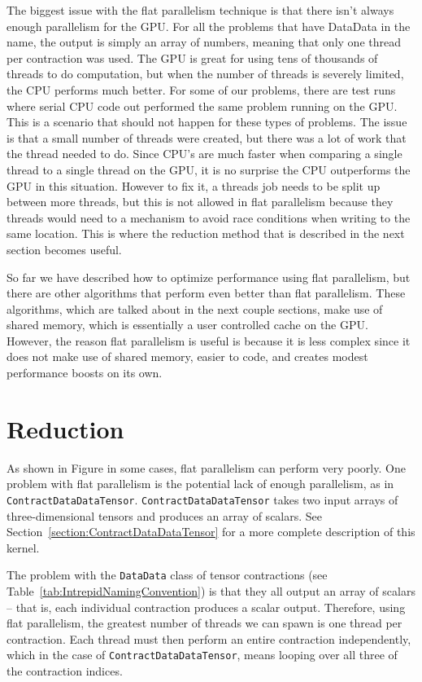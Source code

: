 The biggest issue with the flat parallelism technique is that there isn't always enough parallelism for the GPU. For all the problems that have DataData in the name, the output is simply an array of numbers, meaning that only one thread per contraction was used. The GPU is great for using tens of thousands of threads to do computation, but when the number of threads is severely limited, the CPU performs much better. For some of our problems, there are test runs where serial CPU code out performed the same problem running on the GPU. This is a scenario that should not happen for these types of problems. The issue is that a small number of threads were created, but there was a lot of work that the thread needed to do. Since CPU's are much faster when comparing a single thread to a single thread on the GPU, it is no surprise the CPU outperforms the GPU in this situation. However to fix it, a threads job needs to be split up between more threads, but this is not allowed in flat parallelism because they threads would need to a mechanism to avoid race conditions when writing to the same location. This is where the reduction method that is described in the next section becomes useful.

So far we have described how to optimize performance using flat parallelism, but there are other algorithms that perform even better than flat parallelism. These algorithms, which are talked about in the next couple sections, make use of shared memory, which is essentially a user controlled cache on the GPU. However, the reason flat parallelism is useful is because it is less complex since it does not make use of shared memory, easier to code, and creates modest performance boosts on its own. 

\section{Reduction}
As shown in Figure %
in some cases, flat parallelism can perform very poorly.  One problem with flat
parallelism is the potential lack of enough parallelism, as in
\texttt{ContractDataDataTensor}.  \texttt{ContractDataDataTensor} takes two
input arrays of three-dimensional tensors and produces an array of scalars.  See
Section~\ref{section:ContractDataDataTensor} for a more complete description of
this kernel.

The problem with the \texttt{DataData} class of tensor contractions (see
Table~\ref{tab:IntrepidNamingConvention}) is that they all output an array of
scalars -- that is, each individual contraction produces a scalar output.
Therefore, using flat parallelism, the greatest number of threads we can spawn
is one thread per contraction.  Each thread must then perform an entire
contraction independently, which in the case of \texttt{ContractDataDataTensor},
means looping over all three of the contraction indices.

